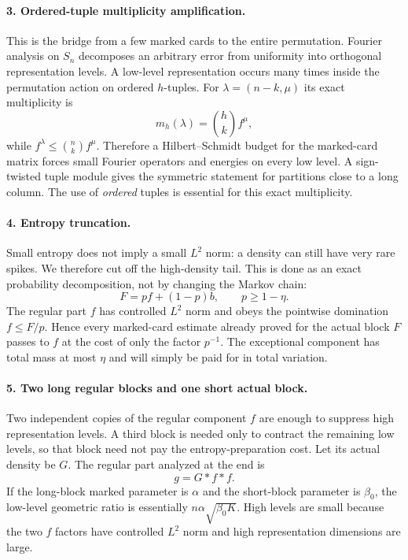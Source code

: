 \documentclass[11pt]{article}
\numberwithin{equation}{section}
\theoremstyle{definition}\newtheorem{definition}[theorem]{Definition}
\theoremstyle{remark}\newtheorem{remark}[theorem]{Remark}
\begin{document}
\paragraph{3. Ordered-tuple multiplicity amplification.}
This is the bridge from a few marked cards to the entire permutation.  Fourier
analysis on $S_n$ decomposes an arbitrary error from uniformity into
orthogonal representation levels.  A low-level representation occurs many
times inside the permutation action on ordered $h$-tuples.  For
$\lambda=(n-k,\mu)$ its exact multiplicity is
\[
 m_h(\lambda)=\binom hk f^\mu,
\]
while
$f^\lambda\le\binom nk f^\mu$.  Therefore a Hilbert--Schmidt budget for the
marked-card matrix forces small Fourier operators and energies on every low
level.  A sign-twisted tuple module gives the symmetric statement for
partitions close to a long column.  The use of \emph{ordered} tuples is
essential for this exact multiplicity.

\paragraph{4. Entropy truncation.}
Small entropy does not imply a small $L^2$ norm: a density can still have very
rare spikes.  We therefore cut off the high-density tail.  This is done as an
exact probability decomposition, not by changing the Markov chain:
\[
 F=pf+(1-p)b,\qquad p\ge1-\eta.
\]
The regular part $f$ has controlled $L^2$ norm and obeys the pointwise
domination $f\le F/p$.  Hence every marked-card estimate already proved for
the actual block $F$ passes to $f$ at the cost of only the factor $p^{-1}$.
The exceptional component has total mass at most $\eta$ and will simply be
paid for in total variation.

\paragraph{5. Two long regular blocks and one short actual block.}
Two independent copies of the regular component $f$ are enough to suppress
high representation levels.  A third block is needed only to contract the
remaining low levels, so that block need not pay the entropy-preparation cost.
Let its actual density be $G$.  The regular part analyzed at the end is
\[
 g=G*f*f.
\]
If the long-block marked parameter is $\alpha$ and the short-block parameter
is $\beta_0$, the low-level geometric ratio is essentially
$n\alpha\sqrt{\beta_0K}$.  High levels are small because the two $f$ factors
have controlled $L^2$ norm and high representation dimensions are large.
\end{document}
